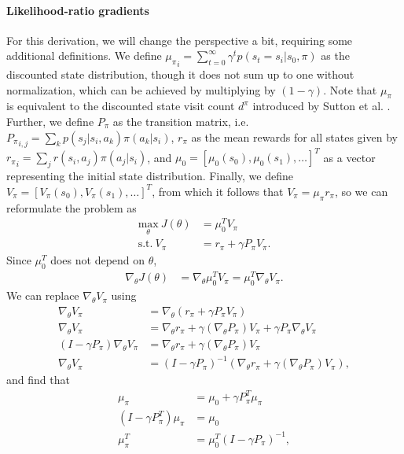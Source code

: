 \documentclass[conference, final]{IEEEtran}
\begin{document}
\paragraph{Likelihood-ratio gradients} 
For this derivation, we will change the perspective a bit, requiring some additional definitions. 
We define ${\mu_\pi}_i = \sum_{t=0}^{\infty} \gamma^t p(s_t=s_i | s_0, \pi)$ as the discounted state distribution, though it does not sum up to one without normalization, which can be achieved by multiplying by $(1-\gamma)$. 
Note that $\mu_\pi$ is equivalent to the discounted state visit count $d^\pi$ introduced by Sutton et al. \cite{Sutton:1999:PGM:3009657.3009806}.
Further, we define $P_\pi$ as the transition matrix, i.e. ${P_\pi}_{i,j}=\sum\nolimits_k p(s_j|s_i,a_k)\pi(a_k|s_i)$, $r_\pi$ as the mean rewards for all states given by ${r_\pi}_i = \sum_j r(s_i,a_j)\pi(a_j|s_i)$, and $\mu_0 = \left[\mu_0(s_0),\mu_0(s_1),\ldots\right]^T$ as a vector representing the initial state distribution.
Finally, we define $V_\pi = \left[ V_\pi(s_0), V_\pi(s_1), \ldots \right]^T$, from which it follows that $V_\pi = \mu_\pi r_\pi$, so we can reformulate the problem as 
\begin{align}
	\underset{\theta}{\text{max}}\ J(\theta) &= \mu_0^T V_\pi \\
	\text{s.t.}\ V_\pi &= r_\pi + \gamma P_\pi V_\pi . \nonumber
\end{align}
Since $\mu_0^T$ does not depend on $\theta$, 
\begin{align*}
	\nabla_\theta J(\theta) &= \nabla_\theta \mu_0^T V_\pi = \mu_0^T \nabla_\theta V_\pi.
\end{align*}
We can replace $\nabla_\theta V_\pi$ using
\begin{align*}
	\nabla_\theta V_\pi &= \nabla_\theta \left( r_\pi + \gamma P_\pi V_\pi \right)
	\\ \nabla_\theta V_\pi &= \nabla_\theta r_\pi + \gamma (\nabla_\theta P_\pi) V_\pi + \gamma P_\pi \nabla_\theta V_\pi
	\\ (I-\gamma P_\pi) \nabla_\theta V_\pi &= \nabla_\theta r_\pi + \gamma (\nabla_\theta P_\pi) V_\pi
	\\ \nabla_\theta V_\pi &= (I - \gamma P_\pi)^{-1} (\nabla_\theta r_\pi + \gamma (\nabla_\theta P_\pi) V_\pi), 
\end{align*}
and find that
\begin{align*}
	\mu_\pi &= \mu_0 + \gamma P_\pi^T \mu_\pi \nonumber \\
	(I- \gamma P_\pi^T)\mu_\pi &= \mu_0 \nonumber \\
	\mu_\pi^T &= \mu_0^T (I- \gamma P_\pi)^{-1} ,
\end{align*}
\end{document}
